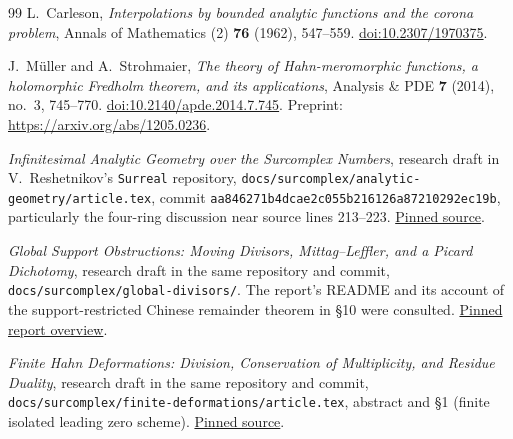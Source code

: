 \documentclass[11pt,letterpaper]{article}
\numberwithin{equation}{section}
\theoremstyle{definition}
\theoremstyle{remark}
\begin{document}
\begin{thebibliography}{99}
L.~Carleson, \emph{Interpolations by bounded analytic functions and the
corona problem}, Annals of Mathematics (2) \textbf{76} (1962), 547--559.
\href{https://doi.org/10.2307/1970375}{doi:10.2307/1970375}.

J.~M\"uller and A.~Strohmaier, \emph{The theory of Hahn-meromorphic
functions, a holomorphic Fredholm theorem, and its applications},
Analysis \& PDE \textbf{7} (2014), no.~3, 745--770.
\href{https://doi.org/10.2140/apde.2014.7.745}{doi:10.2140/apde.2014.7.745}.
Preprint: \url{https://arxiv.org/abs/1205.0236}.

\emph{Infinitesimal Analytic Geometry over the Surcomplex Numbers},
research draft in V.~Reshetnikov's \texttt{Surreal} repository,
\texttt{docs/surcomplex/analytic-geometry/article.tex},
commit \texttt{aa846271b4dcae2c055b216126a87210292ec19b},
particularly the four-ring discussion near source lines 213--223.
\href{https://github.com/VladimirReshetnikov/Surreal/blob/aa846271b4dcae2c055b216126a87210292ec19b/docs/surcomplex/analytic-geometry/article.tex}{Pinned source}.

\emph{Global Support Obstructions: Moving Divisors, Mittag--Leffler,
and a Picard Dichotomy}, research draft in the same
repository and commit, \texttt{docs/surcomplex/global-divisors/}.
The report's README and its account of the support-restricted
Chinese remainder theorem in \S10 were consulted.
\href{https://github.com/VladimirReshetnikov/Surreal/blob/aa846271b4dcae2c055b216126a87210292ec19b/docs/surcomplex/global-divisors/README.md}{Pinned report overview}.

\emph{Finite Hahn Deformations: Division, Conservation of Multiplicity,
and Residue Duality}, research draft in the same repository
and commit, \texttt{docs/surcomplex/finite-deformations/article.tex},
abstract and \S1 (finite isolated leading zero scheme).
\href{https://github.com/VladimirReshetnikov/Surreal/blob/aa846271b4dcae2c055b216126a87210292ec19b/docs/surcomplex/finite-deformations/article.tex}{Pinned source}.

\end{thebibliography}
\end{document}
